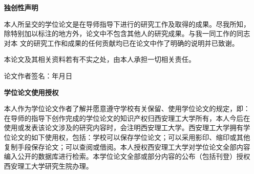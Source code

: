 
\clearpage
\pagestyle{empty}
\newpage
{}
\vspace*{20pt}
\begin{center}{\songti\bfseries 独创性声明}\end{center}
\par\vspace*{25pt}
\renewcommand{\baselinestretch}{1.5}

{ \songti \bfseries

本人所呈交的学位论文是在导师指导下进行的研究工作及取得的成果。尽我所知，除特别加以标注的地方外，论文中不包含其他人的研究成果。与我一同工作的同志对本 文的研究工作和成果的任何贡献均已在论文中作了明确的说明并已致谢。

本论文及其相关资料若有不实之处，由本人承担一切相关责任。

\vspace*{25pt}
\begin{flushright}
论文作者签名：\underline{\hspace{2.3cm}}\hspace{2cm}年\hspace{0.8cm}月\hspace{0.8cm}日
\end{flushright}



\vspace*{88pt}
\begin{center}{\songti\bfseries 学位论文使用授权}\end{center}
\par\vspace*{34pt}

 \songti %

本人作为学位论文作者了解并愿意遵守学校有关保留、使用学位论文的规定，即：在导师的指导下创作完成的学位论文的知识产权归西安理工大学所有，本人今后在使用或发表该论文涉及的研究内容时，会注明西安理工大学。西安理工大学拥有学位论文的如下使用权，包括：学校可以保存学位论文；可以采用影印、缩印或其他复制手段保存论文；可以查阅或借阅。本人授权西安理工大学对学位论文全部内容编入公开的数据库进行检索。本学位论文全部或部分内容的公布（包括刊登）授权西安理工大学研究生院办理。
\vspace*{15pt}

}
